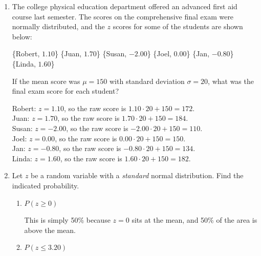 \documentclass{article}
\newcommand{\answer}[1]{\color{white}#1}
\begin{document}
\begin{enumerate}
\item The college physical education department offered an advanced first aid course last semester.  The scores on the comprehensive final exam were normally distributed, and the $z$ scores for some of the students are shown below:
	\begin{center}
	\{Robert,  $1.10$\}  \{Juan, $1.70$\}  \{Susan, $-2.00$\}  \{Joel, $0.00$\}  \{Jan, $-0.80$\}  \{Linda, $1.60$\} 
	\end{center}
	
If the mean score was $\mu = 150$ with standard deviation $\sigma = 20$, what was the final exam score for each student? 

	{\answer Robert: $z= 1.10$, so the raw score is $1.10\cdot 20 + 150 = 172$.  \\
	Juan: $z= 1.70$, so the raw score is $1.70\cdot 20 + 150 = 184$.  \\
	Susan: $z= -2.00$, so the raw score is $-2.00\cdot 20 + 150 = 110$.  \\
	Joel: $z= 0.00$, so the raw score is $0.00\cdot 20 + 150 = 150$.  \\
	Jan: $z= -0.80$, so the raw score is $-0.80\cdot 20 + 150 = 134$.  \\
	Linda: $z= 1.60$, so the raw score is $1.60\cdot 20 + 150 = 182$.  
	} 

\item Let $z$ be a random variable with a {\em standard} normal distribution.  Find the indicated probability.
	\begin{enumerate}
	\item $P(z \geq 0)$ 
	
	{\answer This is simply 50\% because $z=0$ sits at the mean, and 50\% of the area is above the mean.
	} 
	
	\item $P(z \leq 3.20)$  
	

\end{enumerate}
\end{enumerate}
\end{document}
